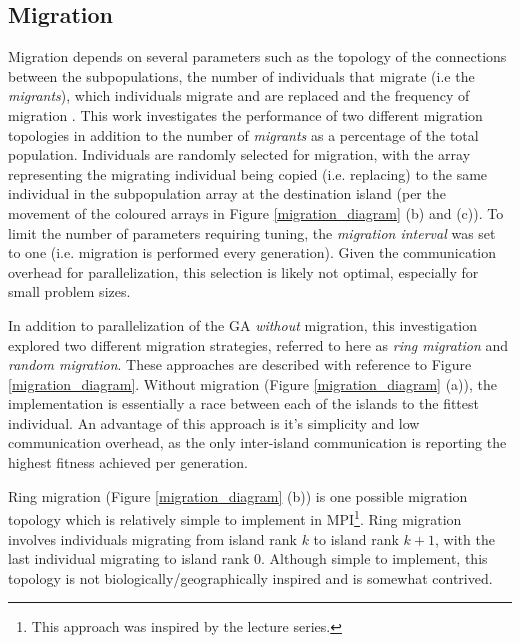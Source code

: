 \documentclass{report}
\begin{document}
\subsection{Migration}
\label{Mig}
Migration depends on several parameters such as the topology of the connections between the subpopulations, the number of individuals that migrate (i.e the \emph{migrants}), which individuals migrate and are replaced and the frequency of migration \cite{nowostawski1999parallel}. This work investigates the performance of two different migration topologies in addition to the number of \emph{migrants} as a percentage of the total population. Individuals are randomly selected for migration, with the array representing the migrating individual being copied (i.e. replacing) to the same individual in the subpopulation array at the destination island (per the movement of the coloured arrays in Figure \ref{migration_diagram} (b) and (c)). To limit the number of parameters requiring tuning, the \emph{migration interval} was set to one (i.e. migration is performed every generation). Given the communication overhead for parallelization, this selection is likely not optimal, especially for small problem sizes.

In addition to parallelization of the GA \emph{without} migration, this investigation explored two different migration strategies, referred to here as \emph{ring migration} and \emph{random migration}. These approaches are described with reference to Figure \ref{migration_diagram}. Without migration (Figure \ref{migration_diagram} (a)), the implementation is essentially a race between each of the islands to the fittest individual. An advantage of this approach is it's simplicity and low communication overhead, as the only inter-island communication is reporting the highest fitness achieved per generation. 

Ring migration (Figure \ref{migration_diagram} (b)) is one possible migration topology which is relatively simple to implement in MPI\footnote{This approach was inspired by the lecture series.}. Ring migration involves individuals migrating from island rank \(k\) to island rank \(k+1\), with the last individual migrating to island rank 0. Although simple to implement, this topology is not biologically/geographically inspired and is somewhat contrived.
\end{document}
